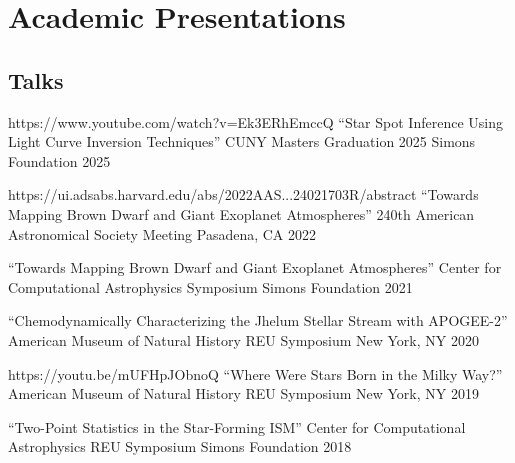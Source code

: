 \section{Academic Presentations}


\subsection*{Talks}

\begin{presentation}
{\cvlink
  {https://www.youtube.com/watch?v=Ek3ERhEmccQ}
  {``Star Spot Inference Using Light Curve Inversion Techniques''}}
{CUNY Masters Graduation 2025}
{Simons Foundation}
{2025}
\end{presentation}

\begin{presentation}
{\cvlink
  {https://ui.adsabs.harvard.edu/abs/2022AAS...24021703R/abstract}
  {``Towards Mapping Brown Dwarf and Giant Exoplanet Atmospheres''}}
{240th American Astronomical Society Meeting}
{Pasadena, CA}
{2022}
\end{presentation}

\begin{presentation}
{``Towards Mapping Brown Dwarf and Giant Exoplanet Atmospheres''}
{Center for Computational Astrophysics Symposium}
{Simons Foundation}
{2021}
\end{presentation}

\begin{presentation}
{``Chemodynamically Characterizing the Jhelum Stellar Stream with APOGEE-2''}
{American Museum of Natural History REU Symposium}
{New York, NY}
{2020}
\end{presentation}

\begin{presentation}
{\cvlink
  {https://youtu.be/mUFHpJObnoQ}
  {``Where Were Stars Born in the Milky Way?''}}
{American Museum of Natural History REU Symposium}
{New York, NY}
{2019}
\end{presentation}

\begin{presentation}
{``Two-Point Statistics in the Star-Forming ISM''}
{Center for Computational Astrophysics REU Symposium}
{Simons Foundation}
{2018}
\end{presentation}

